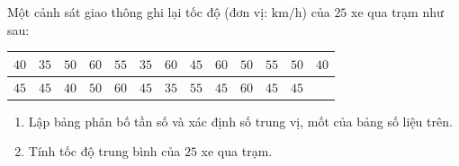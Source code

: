 \begin{bt}%
	Một cảnh sát giao thông ghi lại tốc độ (đơn vị: $\mathrm{km} / \mathrm{h}$) của $25$ xe qua trạm như sau:
	\begin{center}
		\begin{tabular}{|l|l|l|l|l|l|l|l|l|l|l|l|l|}
			\hline
			$40$ & $35$ & $50$ & $60$ & $55$ & $35$ & $60$ & $45$ & $60$ & $50$ & $55$ & $50$ & $40$ \\
			\hline
			$45$ & $45$ & $40$ & $50$ & $60$ & $45$ & $35$ & $55$ & $45$ & $60$ & $45$ & $45$ &  \\
			\hline
		\end{tabular}
	\end{center}
	\begin{enumerate}
		\item Lập bảng phân bố tần số và xác định số trung vị, mốt của bảng số liệu trên.
		\item Tính tốc độ trung bình của $25$ xe qua trạm.
	\end{enumerate}
\end{bt}

